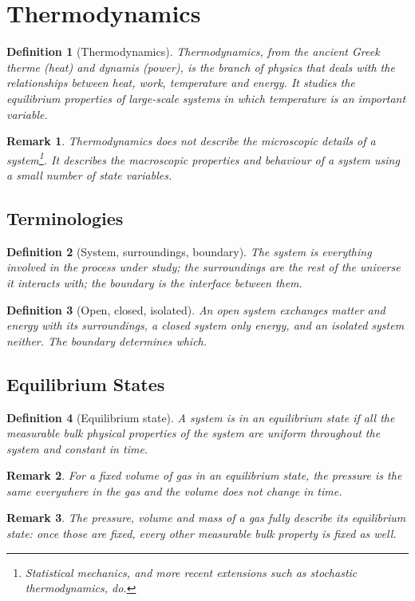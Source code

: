 \documentclass{article}
\newtheorem{definition}{Definition}
\newtheorem{remark}{Remark}
\begin{document}
\section{Thermodynamics}
\begin{definition}[Thermodynamics]
    Thermodynamics, from the ancient Greek \textit{therme} (heat) and \textit{dynamis} (power), is the branch of physics that deals with the relationships between heat, work, temperature and energy. It studies the equilibrium properties of large-scale systems in which temperature is an important variable.
\end{definition}
\begin{remark}
    Thermodynamics does not describe the microscopic details of a system\footnote{Statistical mechanics, and more recent extensions such as stochastic thermodynamics, do.}. It describes the macroscopic properties and behaviour of a system using a small number of state variables.
\end{remark}

\subsection{Terminologies}
\begin{definition}[System, surroundings, boundary]
    The system is everything involved in the process under study; the surroundings are the rest of the universe it interacts with; the boundary is the interface between them.
\end{definition}
\begin{definition}[Open, closed, isolated]
    An open system exchanges matter and energy with its surroundings, a closed system only energy, and an isolated system neither. The boundary determines which.
\end{definition}

\subsection{Equilibrium States}
\begin{definition}[Equilibrium state]
    A system is in an equilibrium state if all the measurable bulk physical properties of the system are uniform throughout the system and constant in time.
\end{definition}
\begin{remark}
    For a fixed volume of gas in an equilibrium state, the pressure is the same everywhere in the gas and the volume does not change in time.
\end{remark}
\begin{remark}
    The pressure, volume and mass of a gas fully describe its equilibrium state: once those are fixed, every other measurable bulk property is fixed as well.
\end{remark}
\end{document}
